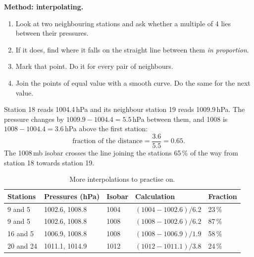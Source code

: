 \textbf{Method: interpolating.}
\begin{enumerate}[label=\textbf{\arabic*.},leftmargin=*,itemsep=3pt]
\item Look at two neighbouring stations and ask whether a multiple of 4 lies between their pressures.
\item If it does, find where it falls on the straight line between them \emph{in proportion}.
\item Mark that point. Do it for every pair of neighbours.
\item Join the points of equal value with a smooth curve. Do the same for the next value.
\end{enumerate}

\begin{workedbox}
Station 18 reads 1004.4\,hPa and its neighbour station 19 reads 1009.9\,hPa. The pressure changes by $1009.9-1004.4=5.5$\,hPa between them, and 1008 is $1008-1004.4=3.6$\,hPa above the first station:
\[
\text{fraction of the distance}=\frac{3.6}{5.5}=0.65 .
\]
The 1008\,mb isobar crosses the line joining the stations 65\,\% of the way from station 18 towards station 19.
\begin{center}
\end{center}
\end{workedbox}

\begin{table}[ht]
\centering
\caption{More interpolations to practise on.}
\begin{tabular}{@{}lllll@{}}
\toprule
\textbf{Stations} & \textbf{Pressures (hPa)} & \textbf{Isobar} & \textbf{Calculation} & \textbf{Fraction}\\
\midrule
9 and 5 & 1002.6, 1008.8 & 1004 & $(1004-1002.6)/6.2$ & 23\,\%\\
9 and 5 & 1002.6, 1008.8 & 1008 & $(1008-1002.6)/6.2$ & 87\,\%\\
16 and 5 & 1006.9, 1008.8 & 1008 & $(1008-1006.9)/1.9$ & 58\,\%\\
20 and 24 & 1011.1, 1014.9 & 1012 & $(1012-1011.1)/3.8$ & 24\,\%\\
\bottomrule
\end{tabular}
\end{table}

